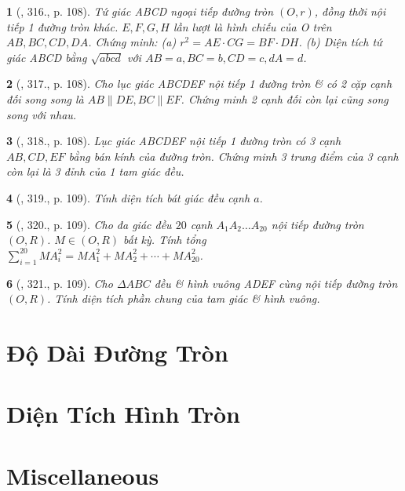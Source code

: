 \documentclass{article}
\newtheorem{baitoan}{}
\begin{document}
\begin{baitoan}[\cite{Binh_Toan_9_tap_2}, 316., p. 108]
	Tứ giác ABCD ngoại tiếp đường tròn $(O,r)$, đồng thời nội tiếp 1 đường tròn khác. $E,F,G,H$ lần lượt là hình chiếu của O trên $AB,BC,CD,DA$. Chứng minh: (a) $r^2 = AE\cdot CG = BF\cdot DH$. (b) Diện tích tứ giác ABCD bằng $\sqrt{abcd}$ với $AB = a,BC = b,CD = c,dA = d$.
\end{baitoan}

\begin{baitoan}[\cite{Binh_Toan_9_tap_2}, 317., p. 108]
	Cho lục giác ABCDEF nội tiếp 1 đường tròn \& có 2 cặp cạnh đối song song là $AB\parallel DE,BC\parallel EF$. Chứng minh 2 cạnh đối còn lại cũng song song với nhau.
\end{baitoan}

\begin{baitoan}[\cite{Binh_Toan_9_tap_2}, 318., p. 108]
	Lục giác ABCDEF nội tiếp 1 đường tròn có 3 cạnh $AB,CD,EF$ bằng bán kính của đường tròn. Chứng minh 3 trung điểm của 3 cạnh còn lại là 3 đỉnh của 1 tam giác đều.
\end{baitoan}

\begin{baitoan}[\cite{Binh_Toan_9_tap_2}, 319., p. 109]
	Tính diện tích bát giác đều cạnh $a$.
\end{baitoan}

\begin{baitoan}[\cite{Binh_Toan_9_tap_2}, 320., p. 109]
	Cho đa giác đều $20$ cạnh $A_1A_2\ldots A_{20}$ nội tiếp đường tròn $(O,R)$. $M\in(O,R)$ bất kỳ. Tính tổng $\sum_{i=1}^{20} MA_i^2 = MA_1^2 + MA_2^2 + \cdots + MA_{20}^2$.
\end{baitoan}

\begin{baitoan}[\cite{Binh_Toan_9_tap_2}, 321., p. 109]
	Cho $\Delta ABC$ đều \& hình vuông ADEF cùng nội tiếp đường tròn $(O,R)$. Tính diện tích phần chung của tam giác \& hình vuông.
\end{baitoan}


\section{Độ Dài Đường Tròn}


\section{Diện Tích Hình Tròn}


\section{Miscellaneous}




\printbibliography[heading=bibintoc]
\end{document}

